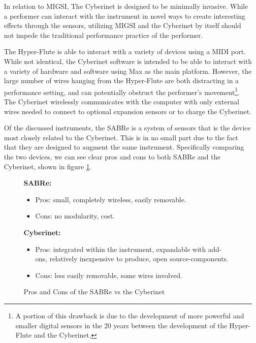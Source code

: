 In relation to MIGSI, The Cyberinet is designed to be minimally invasive. While a performer can interact with the instrument in novel ways to create interesting effects through the sensors, utilizing MIGSI and the Cyberinet by itself should not impede the traditional performance practice of the performer. %

The Hyper-Flute is able to interact with a variety of devices using a MIDI port. While not identical, the Cyberinet software is intended to be able to interact with a variety of hardware and software using Max as the main platform. However, the large number of wires hanging from the Hyper-Flute are both distracting in a performance setting, and can potentially obstruct the performer's movement\footnote{A portion of this drawback is due to the development of more powerful and smaller digital sensors in the 20 years between the development of the Hyper-Flute and the Cyberinet, }. The Cyberinet wirelessly communicates with the computer with only external wires needed to connect to optional expansion sensors or to charge the Cyberinet.


Of the discussed instruments, the SABRe is a system of sensors that is the device most closely related to the Cyberinet. This is in no small part due to the fact that they are designed to augment the same instrument. Specifically comparing the two devices, we can see clear pros and cons to both SABRe and the Cyberinet, shown in figure \ref{fig:proCon_SABRe_Cyberinet}.

\begin{figure}
    \centering
   \textbf{SABRe:}

\begin{itemize}
    \item Pros: small, completely wireless, easily removable.
    \item Cons: no modularity, cost.
\end{itemize}

\textbf{Cyberinet:} 

\begin{itemize}
    \item Pros: integrated within the instrument, expandable with add-ons, relatively inexpensive to produce, open source-components.
    \item Cons: less easily removable, some wires involved.
\end{itemize}
    \caption{Pros and Cons of the SABRe vs the Cyberinet}
    \label{fig:proCon_SABRe_Cyberinet}
\end{figure}

